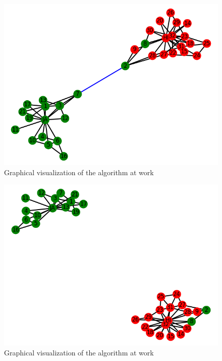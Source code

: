 \documentclass[11pt]{article}
\begin{document}
	\begin{figure}[h!]
		\includegraphics[scale=0.5]{resources/myplot2.png}
		\caption{Graphical visualization of the algorithm at work }
	\end{figure}
	\begin{figure}[h!]
		\includegraphics[scale=0.5]{resources/myplot1.png}
		\caption{Graphical visualization of the algorithm at work }
	\end{figure}
\end{document}
